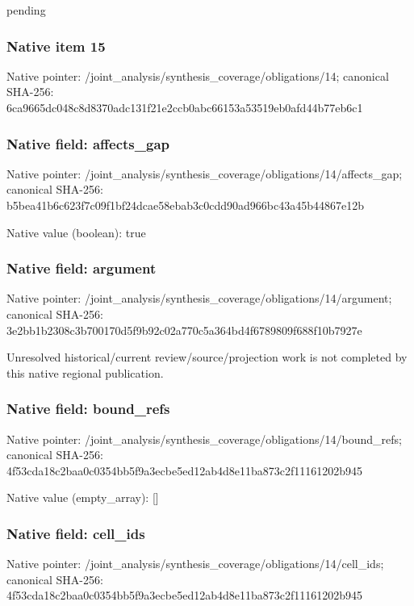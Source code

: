 \documentclass[10pt,a4paper]{article}
\begin{document}
\begingroup\raggedright\sloppy pending\par\endgroup

\subsubsection{Native item 15}
Native pointer: /joint\_\allowbreak{}analysis/synthesis\_\allowbreak{}coverage/obligations/14; canonical SHA-256: 6ca9665dc048c8d8370adc131f21e2ccb0abc66153a53519eb0afd44b77eb6c1

\subsubsection{Native field: affects\_\allowbreak{}gap}
Native pointer: /joint\_\allowbreak{}analysis/synthesis\_\allowbreak{}coverage/obligations/14/affects\_\allowbreak{}gap; canonical SHA-256: b5bea41b6c623f7c09f1bf24dcae58ebab3c0cdd90ad966bc43a45b44867e12b

Native value (boolean): true

\subsubsection{Native field: argument}
Native pointer: /joint\_\allowbreak{}analysis/synthesis\_\allowbreak{}coverage/obligations/14/argument; canonical SHA-256: 3e2bb1b2308c3b700170d5f9b92c02a770c5a364bd4f6789809f688f10b7927e

\begingroup\raggedright\sloppy Unresolved historical/\allowbreak{}current review/\allowbreak{}source/\allowbreak{}projection work is not completed by this native regional publication.\par\endgroup

\subsubsection{Native field: bound\_\allowbreak{}refs}
Native pointer: /joint\_\allowbreak{}analysis/synthesis\_\allowbreak{}coverage/obligations/14/bound\_\allowbreak{}refs; canonical SHA-256: 4f53cda18c2baa0c0354bb5f9a3ecbe5ed12ab4d8e11ba873c2f11161202b945

Native value (empty\_\allowbreak{}array): []

\subsubsection{Native field: cell\_\allowbreak{}ids}
Native pointer: /joint\_\allowbreak{}analysis/synthesis\_\allowbreak{}coverage/obligations/14/cell\_\allowbreak{}ids; canonical SHA-256: 4f53cda18c2baa0c0354bb5f9a3ecbe5ed12ab4d8e11ba873c2f11161202b945
\end{document}
